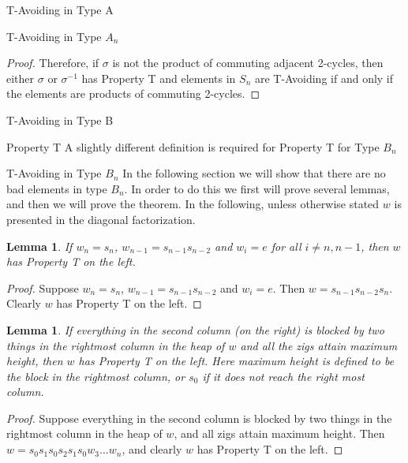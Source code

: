 \documentclass[11pt]{amsart}
\newtheorem{lemma}[theorem]{Lemma}
\theoremstyle{definition}
\numberwithin{equation}{section}
\renewcommand{\(}{\left(}
\renewcommand{\)}{\right)}
\begin{document}
\begin{section}{T-Avoiding in Type A}
\begin{subsection}{T-Avoiding in Type \textbf{$A_n$}}
\begin{proof}
Therefore, if $\sigma$ is not the product of commuting adjacent 2-cycles, then either $\sigma$ or $\sigma^{-1}$ has Property T and elements in $S_n$ are T-Avoiding if and only if the elements are products of commuting 2-cycles.   
\end{proof}

\end{subsection}
	
\end{section}

\begin{section}{T-Avoiding in Type B}
\begin{subsection}{Property T}
A slightly different definition is required for Property T for Type $B_n$	
\end{subsection}

\begin{subsection}{T-Avoiding in Type $B_n$}
In the following section we will show that there are no bad elements in type $B_n$. In order to do this we first will prove several lemmas, and then we will prove the theorem. In the following, unless otherwise stated $w$ is presented in the diagonal factorization.
\begin{lemma}
If $w_n=s_n$, $w_{n-1}=s_{n-1}s_{n-2}$ and $w_i=e$ for all $i \neq n, n-1$, then $w$ has Property T on the left.	
\end{lemma}
\begin{proof}	
Suppose $w_n=s_n$, $w_{n-1}=s_{n-1}s_{n-2}$ and $w_i=e$. Then $w=s_{n-1}s_{n-2}s_n$. Clearly $w$ has Property T on the left.
\end{proof}

\begin{lemma}
If everything in the second column (on the right) is blocked by two things in the rightmost column in the heap of $w$ and all the zigs attain maximum height, then $w$ has Property T on the left.	Here maximum height is defined to be the block in the rightmost column, or $s_0$ if it does not reach the right most column.
\end{lemma}
\begin{proof}
Suppose everything in the second column is blocked by two things in the rightmost column in the heap of $w$, and all zigs attain maximum height. Then $w=s_0s_1s_0s_2s_1s_0w_3 \ldots w_n$, and clearly $w$ has Property T on the left.	
\end{proof}


\end{subsection}
\end{section}
\end{document}
